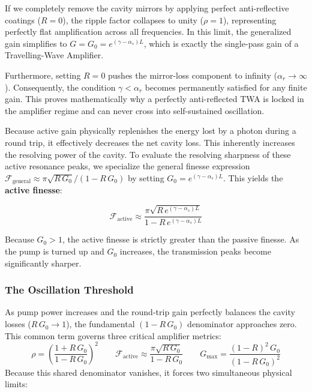 \begin{keyinsight}
    If we completely remove the cavity mirrors by applying perfect anti-reflective coatings ($R=0$), the ripple factor collapses to unity ($\rho = 1$), representing perfectly flat amplification across all frequencies. In this limit, the generalized gain simplifies to $G = G_0 = e^{(\gamma-\alpha_s)L}$, which is exactly the single-pass gain of a Travelling-Wave Amplifier.

    Furthermore, setting $R=0$ pushes the mirror-loss component to infinity ($\alpha_r \to \infty$). Consequently, the condition $\gamma < \alpha_r$ becomes permanently satisfied for any finite gain. This proves mathematically why a perfectly anti-reflected TWA is locked in the amplifier regime and can never cross into self-sustained oscillation.
\end{keyinsight}

Because active gain physically replenishes the energy lost by a photon during a round trip, it effectively decreases the net cavity loss. This inherently increases the resolving power of the cavity. To evaluate the resolving sharpness of these active resonance peaks, we specialize the general finesse expression $\mathcal{F}_{\text{general}} \approx \pi\sqrt{R\,G_0}/(1 - R\,G_0)$ by setting $G_0 = e^{(\gamma - \alpha_s)L}$. This yields the \textbf{active finesse}:
\begin{keyresult}
    \begin{equation}
        \mathcal{F}_{\text{active}} \approx \frac{\pi\sqrt{R\,e^{(\gamma - \alpha_s)L}}}{1 - R\,e^{(\gamma - \alpha_s)L}}
    \end{equation}
\end{keyresult}
Because $G_0 > 1$, the active finesse is strictly greater than the passive finesse. As the pump is turned up and $G_0$ increases, the transmission peaks become significantly sharper.

\subsubsection{The Oscillation Threshold}

As pump power increases and the round-trip gain perfectly balances the cavity losses ($R\,G_0 \to 1$), the fundamental $(1 - R\,G_0)$ denominator approaches zero. This common term governs three critical amplifier metrics:
\begin{equation*}
    \rho = \left(\frac{1 + R\,G_0}{1 - R\,G_0}\right)^2 \qquad \mathcal{F}_{\text{active}} \approx \frac{\pi\sqrt{R\,G_0}}{1 - R\,G_0} \qquad G_{\max} = \frac{(1-R)^2\,G_0}{(1-R\,G_0)^2}
\end{equation*}
Because this shared denominator vanishes, it forces two simultaneous physical limits:

